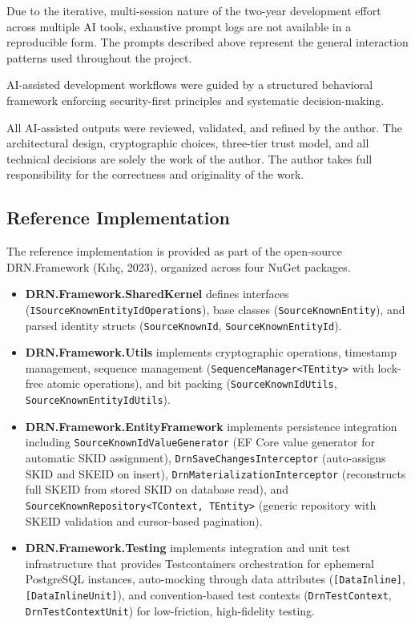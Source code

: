 \documentclass[fleqn,10pt,lineno]{wlpeerj}
\providecommand{\tightlist}{%
  \setlength{\itemsep}{0pt}\setlength{\parskip}{0pt}}
\begin{document}
Due to the iterative, multi-session nature of the two-year development
effort across multiple AI tools, exhaustive prompt logs are not
available in a reproducible form. The prompts described above represent
the general interaction patterns used throughout the project.

AI-assisted development workflows were guided by a structured behavioral
framework enforcing security-first principles and systematic
decision-making.

All AI-assisted outputs were reviewed, validated, and refined by the
author. The architectural design, cryptographic choices, three-tier
trust model, and all technical decisions are solely the work of the
author. The author takes full responsibility for the correctness and
originality of the work.

\newpage

\subsection{Reference Implementation}\label{reference-implementation}

The reference implementation is provided as part of the open-source
DRN.Framework (Kılıç, 2023), organized across four NuGet packages.

\begin{itemize}
\tightlist
\item
  \textbf{DRN.Framework.SharedKernel} defines interfaces
  (\texttt{ISourceKnownEntityIdOperations}), base classes
  (\texttt{SourceKnownEntity}), and parsed identity structs
  (\texttt{SourceKnownId}, \texttt{SourceKnownEntityId}).
\item
  \textbf{DRN.Framework.Utils} implements cryptographic operations,
  timestamp management, sequence management
  (\texttt{SequenceManager\textless{}TEntity\textgreater{}} with
  lock-free atomic operations), and bit packing
  (\texttt{SourceKnownIdUtils}, \texttt{SourceKnownEntityIdUtils}).
\item
  \textbf{DRN.Framework.EntityFramework} implements persistence
  integration including \texttt{SourceKnownIdValueGenerator} (EF Core
  value generator for automatic SKID assignment),
  \texttt{DrnSaveChangesInterceptor} (auto-assigns SKID and SKEID on
  insert), \texttt{DrnMaterializationInterceptor} (reconstructs full
  SKEID from stored SKID on database read), and
  \texttt{SourceKnownRepository\textless{}TContext,\ TEntity\textgreater{}}
  (generic repository with SKEID validation and cursor-based
  pagination).
\item
  \textbf{DRN.Framework.Testing} implements integration and unit test
  infrastructure that provides Testcontainers orchestration for
  ephemeral PostgreSQL instances, auto-mocking through data attributes
  (\texttt{{[}DataInline{]}}, \texttt{{[}DataInlineUnit{]}}), and
  convention-based test contexts (\texttt{DrnTestContext},
  \texttt{DrnTestContextUnit}) for low-friction, high-fidelity testing.
\end{itemize}
\end{document}
